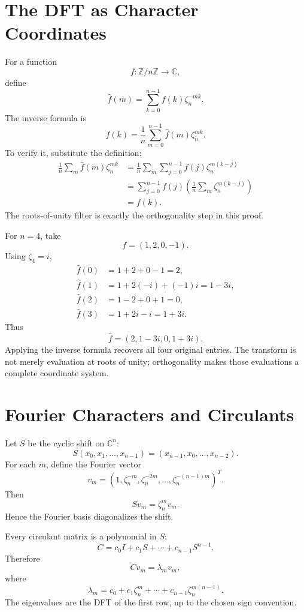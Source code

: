 \section{The DFT as Character Coordinates}

For a function
\[
  f:\mathbb Z/n\mathbb Z\to\mathbb C,
\]
define
\[
  \widehat f(m)
  =\sum_{k=0}^{n-1}
  f(k)\zeta_n^{-mk}.
\]
The inverse formula is
\[
  \boxed{
  f(k)=\frac1n
  \sum_{m=0}^{n-1}
  \widehat f(m)\zeta_n^{mk}.}
\]
To verify it, substitute the definition:
\[
\begin{aligned}
  \frac1n\sum_m\widehat f(m)\zeta_n^{mk}
  &=\frac1n
    \sum_m\sum_{j=0}^{n-1}
    f(j)\zeta_n^{m(k-j)}\\
  &=\sum_{j=0}^{n-1}f(j)
    \left(
    \frac1n\sum_m\zeta_n^{m(k-j)}
    \right)\\
  &=f(k).
\end{aligned}
\]
The roots-of-unity filter is exactly the orthogonality step in this proof.

For \(n=4\), take
\[
  f=(1,2,0,-1).
\]
Using \(\zeta_4=i\),
\[
\begin{aligned}
  \widehat f(0)&=1+2+0-1=2,\\
  \widehat f(1)&=1+2(-i)+(-1)i=1-3i,\\
  \widehat f(2)&=1-2+0+1=0,\\
  \widehat f(3)&=1+2i-i=1+3i.
\end{aligned}
\]
Thus
\[
  \widehat f=(2,1-3i,0,1+3i).
\]
Applying the inverse formula recovers all four original entries.  The transform is not merely evaluation at roots of unity; orthogonality makes those evaluations a complete coordinate system.

\section{Fourier Characters and Circulants}

Let \(S\) be the cyclic shift on \(\mathbb C^n\):
\[
  S(x_0,x_1,\ldots,x_{n-1})
  =(x_{n-1},x_0,\ldots,x_{n-2}).
\]
For each \(m\), define the Fourier vector
\[
  v_m=
  (1,\zeta_n^{-m},\zeta_n^{-2m},\ldots,
  \zeta_n^{-(n-1)m})^T.
\]
Then
\[
  Sv_m=\zeta_n^m v_m.
\]
Hence the Fourier basis diagonalizes the shift.

Every circulant matrix is a polynomial in \(S\):
\[
  C=c_0I+c_1S+\cdots+c_{n-1}S^{n-1}.
\]
Therefore
\[
  Cv_m=\lambda_m v_m,
\]
where
\[
  \lambda_m
  =c_0+c_1\zeta_n^m+\cdots+c_{n-1}\zeta_n^{m(n-1)}.
\]
The eigenvalues are the DFT of the first row, up to the chosen sign convention.

